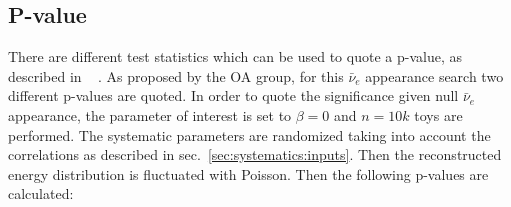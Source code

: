 
\subsection {P-value}
\label{sec:pvalue}


There are different test statistics which can be used to quote a p-value,
as described in 
~\cite{slides_davide_pvalue_asg} %
.
As proposed by the OA group, for this $\bar{\nu}_e$ appearance search two different p-values are quoted.
In order to quote the significance given null $\bar{\nu}_e$ appearance, the parameter of interest is set to $\beta=0$
and $n=10k$ toys are performed.
The systematic parameters are randomized taking into account the correlations as described in sec.~\ref{sec:systematics:inputs}.
Then the reconstructed energy distribution is fluctuated with Poisson. 
Then the following p-values are calculated:
